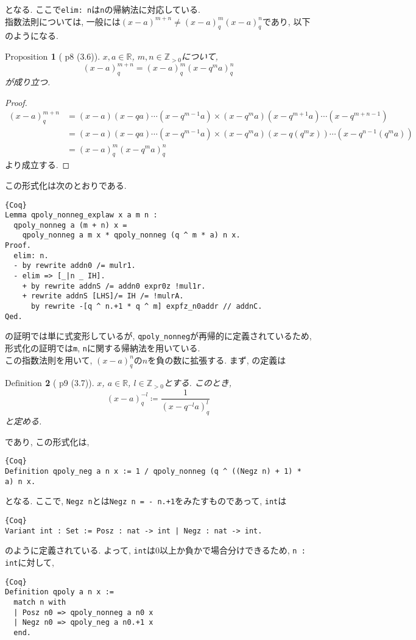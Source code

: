 \documentclass[11pt]{jarticle}
\theoremstyle{mystyle}
\newtheorem{df}{$\textrm{Definition}$}[subsubsection]
\newtheorem{prop}[df]{$\textrm{Proposition}$}
\newcommand{\bdf}{\begin{shadebox} \begin{df}}
\newcommand{\edf}{\end{df} \end{shadebox}}
\newcommand{\bprop}{\begin{shadebox} \begin{prop}}
\newcommand{\eprop}{\end{prop} \end{shadebox}}
\newcommand{\bpf}{\begin{proof}}
\newcommand{\epf}{\end{proof}}
\newcommand{\Z}{\mathbb{Z}}
\newcommand{\R}{\mathbb{R}}
\newcommand{\0}{\textbf{0}}
\newcommand{\1}{\textbf{1}}
\newcommand{\2}{\textbf{2}}
\begin{document}
となる. ここで{\tt elim:\,n}は{\tt n}の帰納法に対応している. \\
指数法則については, 一般には$(x - a)^{m + n} \neq (x - a)^m_q(x - a)^n_q$であり, 以下のようになる. 
\bprop[\cite{Kac} p8 (3.6)] \label{q_exp_low}
  $x,a\in\R$, $m,n\in\Z_{>0}$について, 
  \[
    (x-a)^{m+n}_q = (x-a)^m_q (x-q^ma)^n_q
  \]
  が成り立つ. 
\eprop
\bpf
  \begin{align*}
    (x-a)^{m+n}_q &= (x-a)(x-qa)\cdots(x-q^{m-1}a)
                         \times (x-q^ma)(x-q^{m+1}a)\cdots(x-q^{m+n-1})\\
                       &= (x-a)(x-qa)\cdots(x-q^{m-1}a)
                         \times (x-q^ma)(x-q(q^mx))\cdots(x-q^{n-1}(q^ma))\\
                       &= (x-a)^m_q(x-q^ma)^{n}_q
  \end{align*}
  より成立する.
\epf
この形式化は次のとおりである. 
\begin{lstlisting}{Coq}
Lemma qpoly_nonneg_explaw x a m n :
  qpoly_nonneg a (m + n) x =
    qpoly_nonneg a m x * qpoly_nonneg (q ^ m * a) n x.
Proof.
  elim: n.
  - by rewrite addn0 /= mulr1.
  - elim => [_|n _ IH].
    + by rewrite addnS /= addn0 expr0z !mul1r.
    + rewrite addnS [LHS]/= IH /= !mulrA.
      by rewrite -[q ^ n.+1 * q ^ m] expfz_n0addr // addnC.
Qed.
\end{lstlisting}
\cite{Kac}の証明では単に式変形しているが, {\tt qpoly\_nonneg}が再帰的に定義されているため, 形式化の証明では{\tt m}, {\tt n}に関する帰納法を用いている. \\
この指数法則を用いて, $(x - a)^n_q$の$n$を負の数に拡張する. まず, \cite{Kac}の定義は
\bdf[\cite{Kac} p9 (3.7)] \label{qpoly_neg}
  $x$, $a \in \R$, $l\in\Z_{>0}$とする. このとき, 
  \[
    (x-a)^{-l}_q \coloneqq \frac{1}{(x-q^{-l}a)^l_q}
  \]
  と定める. 
\edf
であり, この形式化は, 
\begin{lstlisting}{Coq}
Definition qpoly_neg a n x := 1 / qpoly_nonneg (q ^ ((Negz n) + 1) * a) n x.
\end{lstlisting}
となる. ここで, {\tt Negz n}とは{\tt Negz n = - n.+1}をみたすものであって, {\tt int}は
\begin{lstlisting}{Coq}
Variant int : Set := Posz : nat -> int | Negz : nat -> int.
\end{lstlisting}
のように定義されている. よって, {\tt int}は$0$以上か負かで場合分けできるため, {\tt n :\,int}に対して, 
\begin{lstlisting}{Coq}
Definition qpoly a n x :=
  match n with
  | Posz n0 => qpoly_nonneg a n0 x
  | Negz n0 => qpoly_neg a n0.+1 x
  end.
\end{lstlisting}
\end{document}

